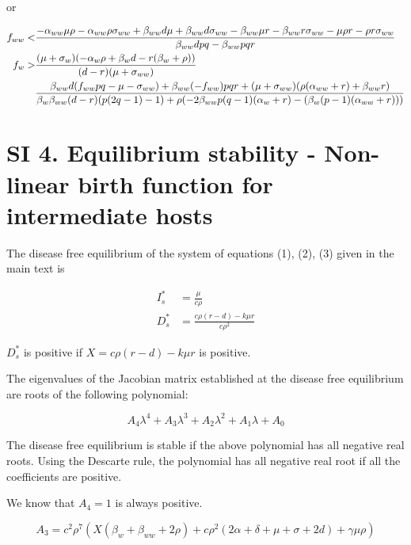 \documentclass[11pt]{article}
\begin{document}
or

\begin{align}
	f_{ww} < & \frac{-\alpha_{ww} \mu  \rho -\alpha_{ww} \rho  \sigma_{ww} + \beta_{ww} d \mu +\beta_{ww} d \sigma_{ww}-\beta_{ww} \mu  r-\beta_{ww} r \sigma_{ww}-\mu  \rho  r-\rho  r \sigma_{ww}}{\beta_{ww} d p q-\beta_{ww} p q r} \notag \\
	f_w > & \frac{(\mu +\sigma_w) (-\alpha_w \rho + \beta_w d-r (\beta_w+\rho ))}{(d-r) (\mu + \sigma_{ww})} \notag \\
	& \frac{\beta_{ww} d (f_{ww} p q-\mu -\sigma_{ww})+\beta_{ww} (-f_{ww}) p q r+(\mu +\sigma_{ww}) (\rho  (\alpha_{ww}+r)+\beta_{ww} r)}{\beta_w \beta_{ww} (d-r) (p (2 q-1)-1)+\rho  (-2 \beta_{ww} p (q-1) (\alpha_w+r)-(\beta_w (p-1) (\alpha_{ww}+r)))} 
\end{align}


\section*{SI 4. Equilibrium stability - Non-linear birth function for intermediate hosts }
The disease free equilibrium of the system of equations (1), (2), (3) given in the main text is

\begin{align}
	I_s^* & = \frac{\mu}{c \rho} \\
	D_s^* & = \frac{c \rho  (r-d)-k \mu  r}{c \rho^2}
\end{align}

$D_s^*$ is positive if $X = c \rho  (r-d)-k \mu  r$ is positive.

The eigenvalues of the Jacobian matrix established at the disease free equilibrium are roots of the following polynomial:

\begin{equation}
	A_4 \lambda^4 + A_3 \lambda^3 + A_2 \lambda^2 + A_1 \lambda + A_0
\end{equation}

The disease free equilibrium is stable if the above polynomial has all negative real roots. Using the Descarte rule, the polynomial has all negative real root if all the coefficients are positive.

We know that $A_4 = 1$ is always positive. 

\begin{equation}
	A_3 = c^2 \rho ^7 (X (\beta_w + \beta_{ww}+2 \rho ) + c \rho^2  (2 \alpha +\delta +\mu +\sigma + 2 d  )+\gamma  \mu  \rho )
\end{equation}
\end{document}
